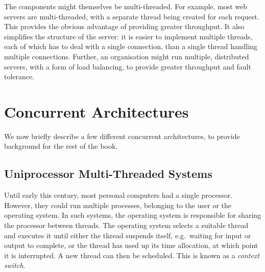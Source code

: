 The components might themselves be multi-threaded.  For example, most web
servers are multi-threaded, with a separate thread being created for each
request.  This provides the obvious advantage of providing greater throughput.
It also simplifies the structure of the server: it is easier to implement
multiple threads, each of which has to deal with a single connection, than a
single thread handling multiple connections.  Further, an organisation might
run multiple, distributed servers, with a form of load balancing, to provide
greater throughput and fault tolerance.


\section{Concurrent Architectures}

We now briefly describe a few different concurrent architectures, to provide
background for the rest of the book.


\subsection{Uniprocessor Multi-Threaded Systems}

Until early this century, most personal computers had a single
processor. However, they could run multiple processes,
belonging to the user or the operating system.
%
In such systems, the operating system is responsible for sharing the processor
between threads.  The operating system selects a suitable
thread and executes it until either the thread suspends itself, e.g.~waiting
for input or output to complete, or the thread has used up its time
allocation, at which point it is interrupted.  A new thread can then be
scheduled.  This is known as a \emph{context switch}. 


